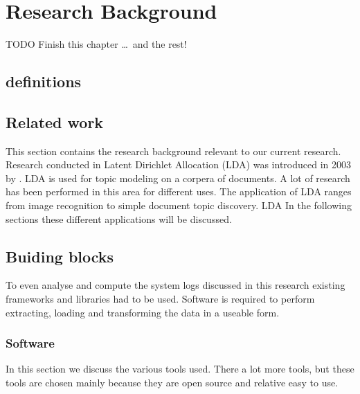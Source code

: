 \chapter{Research Background}  \label{ch:theory}

TODO Finish this chapter \ldots\ and the rest!


\section{definitions}

\section{Related work}  

This section contains the research background relevant to our current research. Research conducted in 
Latent Dirichlet Allocation (LDA) was introduced in 2003 by \cite{Blei2003LatentAllocation}. LDA is used for topic modeling on a corpera of documents. A lot of research has been performed in this area for different uses. The application of LDA ranges from image recognition to simple document topic discovery. LDA  In the following sections these different applications will be discussed.

\section{Buiding blocks}
To even analyse and compute the system logs discussed in this research existing frameworks and libraries had to be used. Software is required to perform extracting, loading and transforming the data in a useable form.

\subsection{Software}
In this section we discuss the various tools used. There a lot more tools, but these tools are chosen mainly because they are open source and relative easy to use.

